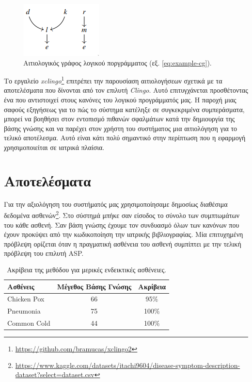 \documentclass[12pt]{extarticle}
\begin{document}
\begin{figure}
    \centering
    \includegraphics{assets/causal_g.png}
    \caption{Αιτιολογικός γράφος λογικού ποργράμματος (εξ. \ref{eq:example-cg}).}
    \label{fig:causal-g}
\end{figure}



Το εργαλείο \textit{xclingo}\footnote{\url{https://github.com/bramucas/xclingo2}} \cite{Cabalar_2020} επιτρέπει την παρουσίαση αιτιολογήσεων σχετικά με τα αποτελέσματα που δίνονται από τον επιλυτή \textit{Clingo}.
Αυτό επιτυγχάνεται προσθέτοντας ένα  που αντιστοιχεί στους κανόνες του λογικού προγράμματός μας.
Η παροχή μιας σαφούς εξηγήσεως για το πώς το σύστημα κατέληξε σε συγκεκριμένα συμπεράσματα, μπορεί να βοηθήσει στον εντοπισμό πιθανών σφαλμάτων κατά την δημιουργία της βάσης γνώσης και να παρέχει στον χρήστη του συστήματος μια αιτιολόγηση για το τελικό αποτέλεσμα. Αυτό είναι κάτι πολύ σημαντικό στην περίπτωση που η εφαρμογή χρησιμοποιείται σε ιατρικά πλαίσια.

\section{Αποτελέσματα}

Για την αξιολόγηση του συστήματός μας χρησιμοποίησαμε δημοσίως διαθέσιμα δεδομένα ασθενών\footnote{\url{https://www.kaggle.com/datasets/itachi9604/disease-symptom-description-dataset?select=dataset.csv}}.
Στο σύστημά μπήκε σαν είσοδος το σύνολο των συμπτωμάτων του κάθε ασθενή.
Σαν βάση γνώσης έχουμε τον συνδυασμό όλων των κανόνων που έχουν προκύψει από την κωδικοποίηση την ιατρικής βιβλιογραφίας.  
Μία επιτυχημένη πρόβλεψη ορίζεται όταν η πραγματική ασθένεια του ασθενή συμπίπτει με την τελική
πρόβλεψη του επιλυτή ASP.

\begin{table}[h]
    \centering
    \begin{tabular}{lcc}
    \hline
    Ασθένεις & Μέγεθος Βάσης Γνώσης & Ακρίβεια \\
    \hline
    \hline
    Chicken Pox      &  66  & 95\% \\
    Pneumonia        &  75  & 100\% \\
    Common Cold    &   44 & 100\% \\
    \hline
    \end{tabular}
    \caption{Ακρίβεια της μεθόδου για μερικές ενδεικτικές ασθένειες.}
\end{table}
\end{document}
